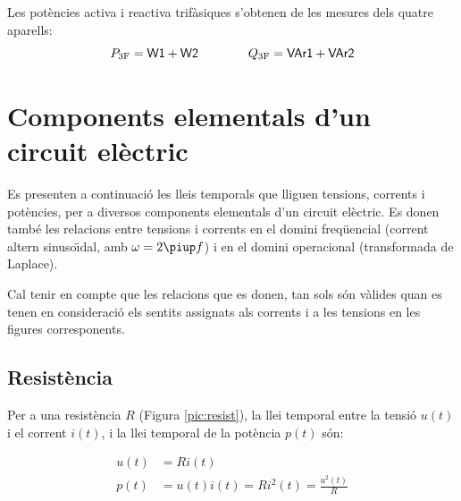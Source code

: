 \begin{center}
\centering
    
    \label{pic:watt_var_3f}
\end{center}

Les pot\`{e}ncies activa i reactiva trif\`{a}siques s'obtenen de les mesures
dels quatre aparells:
\begin{equation}
    P_\mathrm{3F} = \textsf{W1} +  \textsf{W2}
    \qquad\qquad Q_\mathrm{3F} = \textsf{VAr1} +  \textsf{VAr2}
\end{equation}


\section{Components elementals d'un circuit
el\`{e}ctric}\label{sec:comp_elem}

Es presenten a continuaci\'{o} les lleis temporals que lliguen tensions,
corrents i pot\`{e}ncies, per a diversos components elementals d'un
circuit el\`{e}ctric. Es donen tamb\'{e} les relacions entre tensions i
corrents en el domini freq\"{u}encial (corrent altern sinuso\"{\i}dal, amb
$\omega=2\piup f$) i en el domini operacional (transformada de
Laplace).

Cal tenir en compte que les relacions que es donen, tan sols s\'{o}n
v\`{a}lides  quan es tenen en consideraci\'{o} els sentits assignats als
corrents i a les tensions en les figures corresponents.

\subsection{Resist\`{e}ncia} 

Per a una resist\`{e}ncia $R$ (Figura
\vref{pic:resist}), la llei temporal entre la tensi\'{o} $u(t)$ i el
corrent $i(t)$, i la llei temporal de la pot\`{e}ncia $p(t)$ s\'{o}n:

\hfill
\begin{minipage}[b]{5cm}
    
    \label{pic:resist}
\end{minipage}
\hfill
\begin{minipage}[b][3.25cm][t]{8cm}
   \begin{align}
      u(t) &= R i(t) \\  p(t) &= u(t) i(t) = R i^2(t) = \frac{u^2(t)}{R}
   \end{align}
\end{minipage}

